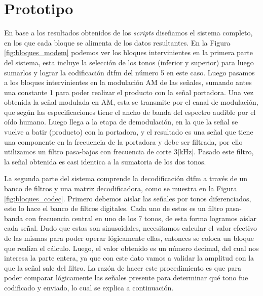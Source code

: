 \begin{figure}[H]
  
\end{figure}

\section{Prototipo}
En base a los resultados obtenidos de los \textit{scripts} diseñamos el sistema completo, en los que cada bloque se alimenta de los datos resultantes. En la Figura \ref{fig:bloques_modem} podemos ver los bloques intervinientes en la primera parte del sistema, esta incluye la selección de los tonos (inferior y superior) para luego sumarlos y lograr la codificación \gls{dtfm} del número 5 en este caso. Luego pasamos a los bloques intervinientes en la modulación AM de las señales, sumando antes una constante 1 para poder realizar el producto con la señal portadora. Una vez obtenida la señal modulada en AM, esta se transmite por el canal de modulación, que según las especificaciones tiene el ancho de banda del espectro audible por el oído humano. Luego llega a la etapa de demodulación, en la que la señal se vuelve a batir (producto) con la portadora, y el resultado es una señal que tiene una componente en la frecuencia de la portadora y debe ser filtrada, por ello utilizamos un filtro pasa-bajos con frecuencia de corte 3[kHz]. Pasado este filtro, la señal obtenida es casi identica a la sumatoria de los dos tonos.

La segunda parte del sistema comprende la decodificación \gls{dtfm} a través de un banco de filtros y una matriz decodificadora, como se muestra en la Figura \ref{fig:bloques_codec}. Primero debemos aislar las señales por tonos diferenciados, esto lo hace el banco de filtros digitales. Cada uno de estos es un filtro pasa-banda con frecuencia central en uno de los 7 tonos, de esta forma logramos aislar cada señal. Dado que estas son sinusoidales, necesitamos calcular el valor efectivo de las mismas para poder operar lógicamente ellas, entonces se coloca un bloque que realiza el cálculo. Luego, el valor obtenido es un número decimal, del cual nos interesa la parte entera, ya que con este dato vamos a validar la amplitud con la que la señal sale del filtro. La razón de hacer este procedimiento es que para poder comparar lógicamente las señales presente para determinar qué tono fue codificado y enviado, lo cual se explica a continuación.

